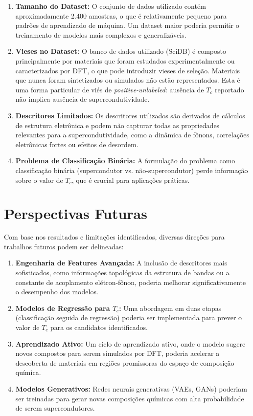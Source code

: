 \documentclass[12pt, a4paper, oneside]{report}
\begin{document}
\begin{enumerate}
    \item \textbf{Tamanho do Dataset:} O conjunto de dados utilizado contém aproximadamente 2.400 amostras, o que é relativamente pequeno para padrões de aprendizado de máquina. Um dataset maior poderia permitir o treinamento de modelos mais complexos e generalizáveis.
    \item \textbf{Vieses no Dataset:} O banco de dados utilizado (SciDB) é composto principalmente por materiais que foram estudados experimentalmente ou caracterizados por DFT, o que pode introduzir vieses de seleção. Materiais que nunca foram sintetizados ou simulados não estão representados. Esta é uma forma particular de viés de \textit{positive-unlabeled}: ausência de $T_c$ reportado não implica ausência de supercondutividade.
    \item \textbf{Descritores Limitados:} Os descritores utilizados são derivados de cálculos de estrutura eletrônica e podem não capturar todas as propriedades relevantes para a supercondutividade, como a dinâmica de fônons, correlações eletrônicas fortes ou efeitos de desordem.
    \item \textbf{Problema de Classificação Binária:} A formulação do problema como classificação binária (supercondutor vs. não-supercondutor) perde informação sobre o valor de $T_c$, que é crucial para aplicações práticas.
\end{enumerate}

\section{Perspectivas Futuras}

Com base nos resultados e limitações identificados, diversas direções para trabalhos futuros podem ser delineadas:

\begin{enumerate}
    \item \textbf{Engenharia de Features Avançada:} A inclusão de descritores mais sofisticados, como informações topológicas da estrutura de bandas ou a constante de acoplamento elétron-fônon, poderia melhorar significativamente o desempenho dos modelos.
    \item \textbf{Modelos de Regressão para $T_c$:} Uma abordagem em duas etapas (classificação seguida de regressão) poderia ser implementada para prever o valor de $T_c$ para os candidatos identificados.
    \item \textbf{Aprendizado Ativo:} Um ciclo de aprendizado ativo, onde o modelo sugere novos compostos para serem simulados por DFT, poderia acelerar a descoberta de materiais em regiões promissoras do espaço de composição química.
    \item \textbf{Modelos Generativos:} Redes neurais generativas (VAEs, GANs) poderiam ser treinadas para gerar novas composições químicas com alta probabilidade de serem supercondutores.
\end{enumerate}
\end{document}
